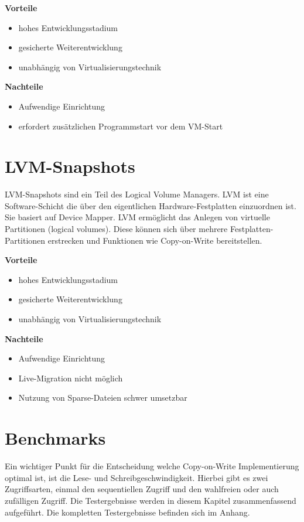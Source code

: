 \textbf{Vorteile}
\begin{itemize}
 \item hohes Entwicklungsstadium
 \item gesicherte Weiterentwicklung
 \item unabhängig von Virtualisierungstechnik
\end{itemize}

\textbf{Nachteile}
\begin{itemize}
 \item Aufwendige Einrichtung
 \item erfordert zusätzlichen Programmstart vor dem VM-Start
\end{itemize}

\section{LVM-Snapshots}
LVM-Snapshots sind ein Teil des Logical Volume Managers. LVM ist eine Software-Schicht die über den eigentlichen Hardware-Festplatten einzuordnen ist. Sie basiert auf Device Mapper. LVM ermöglicht das Anlegen von virtuelle Partitionen (logical volumes). Diese können sich über mehrere Festplatten-Partitionen erstrecken und Funktionen wie Copy-on-Write bereitstellen. \cite{lvmhowto} \cite{lvmselflinux} \cite{lvmsource}

\textbf{Vorteile}
\begin{itemize}
 \item hohes Entwicklungsstadium
 \item gesicherte Weiterentwicklung
 \item unabhängig von Virtualisierungstechnik
\end{itemize}

\textbf{Nachteile}
\begin{itemize}
 \item Aufwendige Einrichtung
 \item Live-Migration nicht möglich
 \item Nutzung von Sparse-Dateien schwer umsetzbar
\end{itemize}

\section{Benchmarks}
Ein wichtiger Punkt für die Entscheidung welche Copy-on-Write Implementierung optimal ist, ist die Lese- und Schreibgeschwindigkeit. Hierbei gibt es zwei Zugriffsarten, einmal den sequentiellen Zugriff und den wahlfreien oder auch zufälligen Zugriff. Die Testergebnisse werden in diesem Kapitel zusammenfassend aufgeführt. Die kompletten Testergebnisse befinden sich im Anhang.

